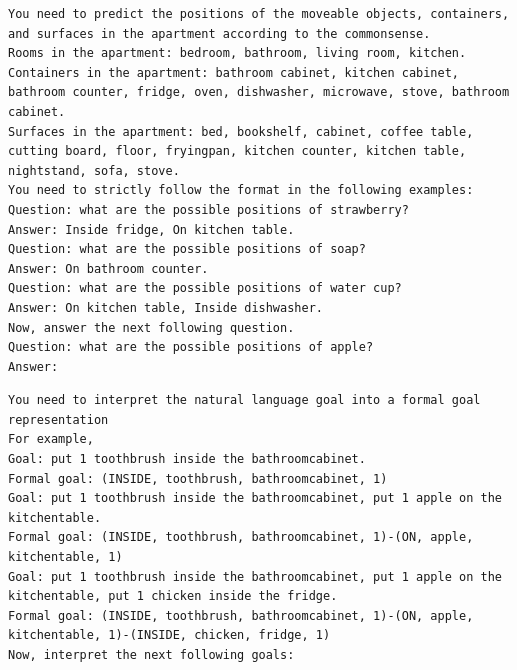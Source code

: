 \begin{lstlisting}[caption=Example prompt for the commonsense world model]
You need to predict the positions of the moveable objects, containers, and surfaces in the apartment according to the commonsense.
Rooms in the apartment: bedroom, bathroom, living room, kitchen.
Containers in the apartment: bathroom cabinet, kitchen cabinet, bathroom counter, fridge, oven, dishwasher, microwave, stove, bathroom cabinet.
Surfaces in the apartment: bed, bookshelf, cabinet, coffee table, cutting board, floor, fryingpan, kitchen counter, kitchen table, nightstand, sofa, stove.
You need to strictly follow the format in the following examples:
Question: what are the possible positions of strawberry?
Answer: Inside fridge, On kitchen table.
Question: what are the possible positions of soap?
Answer: On bathroom counter.
Question: what are the possible positions of water cup?
Answer: On kitchen table, Inside dishwasher.
Now, answer the next following question.
Question: what are the possible positions of apple?
Answer:
\end{lstlisting}

\begin{lstlisting}[caption=Example prompt for the natural language instruction interpretation]
You need to interpret the natural language goal into a formal goal representation
For example,
Goal: put 1 toothbrush inside the bathroomcabinet.
Formal goal: (INSIDE, toothbrush, bathroomcabinet, 1)
Goal: put 1 toothbrush inside the bathroomcabinet, put 1 apple on the kitchentable.
Formal goal: (INSIDE, toothbrush, bathroomcabinet, 1)-(ON, apple, kitchentable, 1)
Goal: put 1 toothbrush inside the bathroomcabinet, put 1 apple on the kitchentable, put 1 chicken inside the fridge.
Formal goal: (INSIDE, toothbrush, bathroomcabinet, 1)-(ON, apple, kitchentable, 1)-(INSIDE, chicken, fridge, 1)
Now, interpret the next following goals:
\end{lstlisting}

